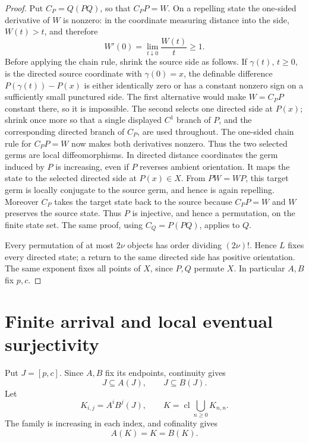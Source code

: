 \documentclass[11pt]{article}
\theoremstyle{definition}
\theoremstyle{remark}
\newcommand{\cl}{\operatorname{cl}}
\begin{document}
\begin{proof}
Put \(C_P=Q(PQ)\), so that \(C_PP=W\).  On a repelling state the one-sided
derivative of \(W\) is nonzero: in the coordinate measuring distance into
the side, \(W(t)>t\), and therefore
\[
 W'(0)=\lim_{t\downarrow0}\frac{W(t)}t\geq1.
\]
Before applying the chain rule, shrink the source side as follows.  If
\(\gamma(t)\), \(t\geq0\), is the directed source coordinate with
\(\gamma(0)=x\), the definable difference
\(P(\gamma(t))-P(x)\) is either identically zero or has a constant nonzero
sign on a sufficiently small punctured side.  The first alternative would make
\(W=C_PP\) constant there, so it is impossible.  The second selects one
directed side at \(P(x)\); shrink once more so that a single displayed
\(C^1\) branch of \(P\), and the corresponding directed branch of \(C_P\),
are used throughout.  The one-sided chain rule for \(C_PP=W\) now makes
both derivatives nonzero.  Thus the two selected germs are local
diffeomorphisms.  In directed distance coordinates the germ induced by
\(P\) is increasing, even if \(P\) reverses ambient orientation.  It maps
the state to the selected directed side at \(P(x)\in X\).  From \(PW=WP\),
this target germ is locally conjugate to the source germ, and hence is again
repelling.
Moreover \(C_P\) takes the target state back to the source because
\(C_PP=W\) and \(W\) preserves the source state.  Thus \(P\) is injective,
and hence a permutation, on the finite state set.  The same proof, using
\(C_Q=P(PQ)\), applies to \(Q\).

Every permutation of at most \(2\nu\) objects has order dividing
\((2\nu)!\).  Hence \(L\) fixes every directed state; a return to the same
directed side has positive orientation.  The same exponent fixes all points
of \(X\), since \(P,Q\) permute \(X\).  In particular \(A,B\) fix \(p,c\).
\end{proof}

\section{Finite arrival and local eventual surjectivity}

Put \(J=[p,c]\).  Since \(A,B\) fix its endpoints, continuity gives
\begin{equation}\label{eq:analytic-J-expands}
 J\subseteq A(J),\qquad J\subseteq B(J).
\end{equation}
Let
\[
 K_{i,j}=A^iB^j(J),\qquad
 K=\cl\bigcup_{n\geq0}K_{n,n}.
\]
The family is increasing in each index, and cofinality gives
\begin{equation}\label{eq:analytic-K-invariant}
 A(K)=K=B(K).
\end{equation}
\end{document}
